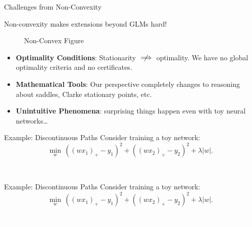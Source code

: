\documentclass[usenames,dvipsnames,mathserif,notheorems]{beamer}
\newcommand{\bad}[1]{\textcolor{bad}{#1}}
\def\showtikz{}
\begin{document}
\begin{frame}{Challenges from Non-Convexity}
	\begin{center}
		\Large
		Non-convexity makes extensions beyond GLMs \bad{hard}!
	\end{center}

	\begin{figure}[]
		\centering
		\ifdefined\showtikz
			
		\else
			\Huge Non-Convex Figure
		\fi
	\end{figure}

	\pause
	\begin{itemize}
		\item \textbf{Optimality Conditions}: Stationarity \( \centernot \implies \) optimality.
		      We have no global optimality criteria and no certificates.

		      \vspace{1em}

		      \pause
		\item \textbf{Mathematical Tools}: Our perspective completely changes
		      to reasoning about saddles, Clarke stationary points, etc.
		      \vspace{1em}

		      \pause

		\item \textbf{Unintuitive Phenomena}: surprising things happen even
		      with toy neural networks\ldots

	\end{itemize}

\end{frame}

\begin{frame}{Example: Discontinuous Paths}
	Consider training a toy network:
	\[
		\min_{w} \, ((w x_1)_+ - y_1)^2 + ((w x_2)_+ - y_2)^2 + \lambda |w|.
	\]

	\begin{center}
		
	\end{center}

	\begin{center}
		\Large
		\textcolor{white}{Goal: New insights via convexification.}
	\end{center}

\end{frame}

\begin{frame}{Example: Discontinuous Paths}
	Consider training a toy network:
	\[
		\min_{w} \, ((w x_1)_+ - y_1)^2 + ((w x_2)_+ - y_2)^2 + \lambda |w|.
	\]

	\begin{center}
		
	\end{center}

	\begin{center}
		\Large
		\textcolor{white}{Goal: New insights via convexification.}
	\end{center}


\end{frame}
\end{document}
